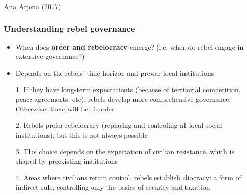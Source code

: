 \documentclass[utf8, xcolor=dvipsnames]{beamer}
\begin{document}
\begin{frame}
\begin{minipage}{0.29\textwidth}
  {\small Ana Arjona (2017)}
\end{minipage}

\end{frame}

\begin{frame}
\frametitle{Understanding rebel governance}
\centering

  \begin{itemize}[<+->]
    \item When does \textbf{order and rebelocracy} emerge? (i.e. when do rebel engage in extensive governance?)
    \item Depends on the rebels' time horizon and prewar local institutions
    \item[1.] If they have long-term expectationts (because of territorial competition, peace agreements, etc), rebels develop more comprehensive governance. Otherwise, there will be disorder
    \item[2.] Rebels prefer rebelocracy (replacing and controling all local social institutions), but this is not always possible
    \item[3.] This choice depends on the expectation of civilian resistance, which is shaped by preexisting institutions
    \item[4.] Areas where civilians retain control, rebels establish aliocracy: a form of indirect rule, controlling only the basics of security and taxation
  \end{itemize}


\end{frame}
\end{document}
